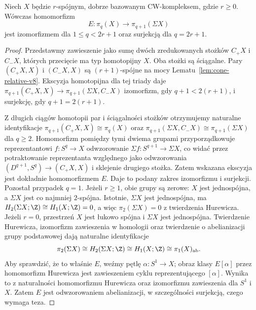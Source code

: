 \begin{twierdzenie}[Freudenthal]
\label{thm:freudenthal-v8}
Niech $X$ będzie $r$-spójnym, dobrze bazowanym
CW-kompleksem, gdzie $r\ge0$. Wówczas homomorfizm
\[
 E:\pi_q(X)\longrightarrow\pi_{q+1}(\Sigma X)
\]
jest izomorfizmem dla $1\le q<2r+1$ oraz
surjekcją dla $q=2r+1$.
\end{twierdzenie}
\begin{proof}
Przedstawmy zawieszenie jako sumę dwóch
zredukowanych stożków $C_+X$ i $C_-X$,
których przecięcie ma typ homotopijny $X$.
Oba stożki są ściągalne. Pary $(C_+X,X)$
i $(C_-X,X)$ są $(r+1)$-spójne na mocy
Lematu~\ref{lem:cone-relative-v8}.
Ekscyzja homotopijna dla tej triady daje
$\pi_{q+1}(C_+X,X)\to
\pi_{q+1}(\Sigma X,C_-X)$
izomorfizm, gdy $q+1<2(r+1)$, i surjekcję,
gdy $q+1=2(r+1)$.

Z długich ciągów homotopii par i ściągalności
stożków otrzymujemy naturalne identyfikacje
$\pi_{q+1}(C_+X,X)\cong\pi_q(X)$ oraz
$\pi_{q+1}(\Sigma X,C_-X)\cong
\pi_{q+1}(\Sigma X)$ dla $q\ge2$.
Homomorfizm pomiędzy tymi dwiema grupami
przyporządkowuje reprezentantowi $f:S^q\to X$
odwzorowanie $\Sigma f:S^{q+1}\to\Sigma X$,
co widać przez potraktowanie reprezentanta względnego
jako odwzorowania $(D^{q+1},S^q)\to(C_+X,X)$
i sklejenie drugiego stożka.
Zatem wskazana ekscyzja jest dokładnie homomorfizmem $E$.
Daje to podany zakres izomorfizmu i surjekcji.
Pozostał przypadek $q=1$. Jeżeli $r\ge1$, obie
grupy są zerowe: $X$ jest jednospójna, a $\Sigma X$
jest co najmniej $2$-spójna. Istotnie, $\Sigma X$ jest
jednospójna, ma $H_2(\Sigma X;\Z)\cong H_1(X;\Z)=0$,
a więc $\pi_2(\Sigma X)=0$ z twierdzenia Hurewicza. Jeżeli $r=0$, przestrzeń $X$
jest łukowo spójna i $\Sigma X$ jest jednospójna.
Twierdzenie Hurewicza, izomorfizm zawieszenia w homologii
oraz twierdzenie o abelianizacji grupy podstawowej dają
naturalne identyfikacje
\[
\pi_2(\Sigma X)\cong H_2(\Sigma X;\Z)
\cong H_1(X;\Z)\cong\pi_1(X)_{\mathrm{ab}}.
\]
Aby sprawdzić, że to właśnie $E$, weźmy pętlę
$\alpha:S^1\to X$; obraz klasy $E[\alpha]$ przez
homomorfizm Hurewicza jest zawieszeniem cyklu
reprezentującego $[\alpha]$. Wynika to z naturalności
homomorfizmu Hurewicza oraz izomorfizmu zawieszenia dla
$S^1$ i $X$. Zatem $E$ jest odwzorowaniem abelianizacji,
w szczególności surjekcją, czego wymaga teza.
\end{proof}

\begin{center}
\end{center}

